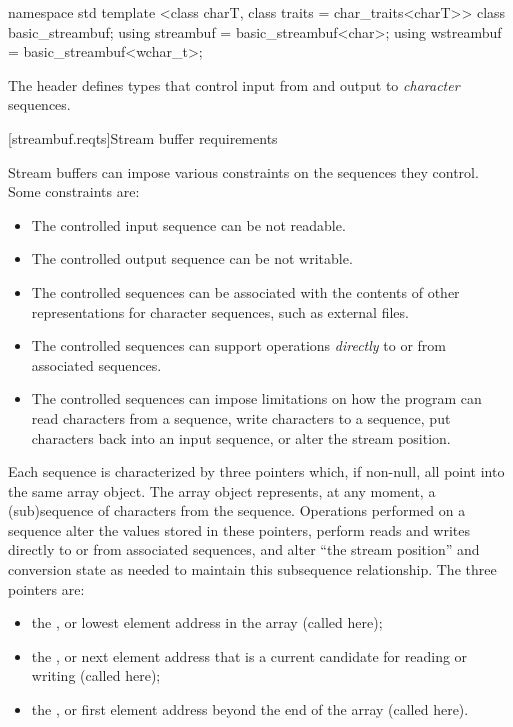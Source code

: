 %
%
%
%
\begin{codeblock}
namespace std {
  template <class charT, class traits = char_traits<charT>>
    class basic_streambuf;
  using streambuf  = basic_streambuf<char>;
  using wstreambuf = basic_streambuf<wchar_t>;
}
\end{codeblock}

\pnum
The header
defines types that control input from and output to
\textit{character}
sequences.

[streambuf.reqts]{Stream buffer requirements}

\pnum
Stream buffers can impose various constraints on the sequences they control.
Some constraints are:
\begin{itemize}
\item
The controlled input sequence can be not readable.
\item
The controlled output sequence can be not writable.
\item
The controlled sequences can be associated with the contents of other
representations for character sequences, such as external files.
\item
The controlled sequences can support operations
\textit{directly}
to or from associated sequences.
\item
The controlled sequences can impose limitations on how the program can
read characters from a sequence,
write characters to a sequence,
put characters back into an input sequence, or
alter the stream position.
\end{itemize}

\pnum
Each sequence is characterized by three pointers which, if non-null,
all point into the same
array object.
The array object represents, at any moment,
a (sub)sequence of characters from the sequence.
Operations performed on a sequence alter the values stored in these pointers,
perform reads and writes directly to or from associated sequences, and
alter ``the stream position'' and conversion state as needed to
maintain this subsequence relationship.
The three pointers are:
\begin{itemize}
\item
the
,
or lowest element address in the array
(called  here);
\item
the
,
or next element address that is a current
candidate for reading or writing (called  here);
\item
the
,
or first element address beyond the end of
the array (called  here).
\end{itemize}

